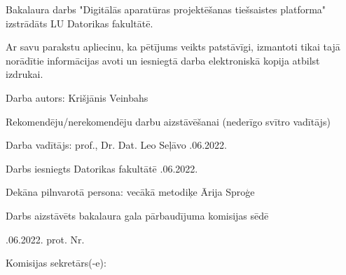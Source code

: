 Bakalaura darbs "Digitālās aparatūras projektēšanas tiešsaistes platforma" izstrādāts LU Datorikas fakultātē.
\vspace{1.5\baselineskip}

Ar savu parakstu apliecinu, ka pētījums veikts patstāvīgi, izmantoti tikai tajā norādītie informācijas avoti un
iesniegtā darba elektroniskā kopija atbilst izdrukai.

Darba autors: \makebox[1.5in]{\hrulefill} Krišjānis Veinbahs
\vspace{1.5\baselineskip}

Rekomendēju/nerekomendēju darbu aizstāvēšanai (nederīgo svītro vadītājs)

Darba vadītājs: prof., Dr. Dat. Leo Seļāvo \makebox[1.5in]{\hrulefill} \makebox[.25in]{\hrulefill}.06.2022.
\vspace{1.5\baselineskip}

Darbs iesniegts Datorikas fakultātē \makebox[1.5in]{\hrulefill} \makebox[.25in]{\hrulefill}.06.2022.
\medskip

Dekāna pilnvarotā persona: vecākā metodiķe Ārija Sproģe \makebox[1.5in]{\hrulefill}
\vspace{1.5\baselineskip}

Darbs aizstāvēts bakalaura gala pārbaudījuma komisijas sēdē

\makebox[.25in]{\hrulefill}.06.2022. prot. Nr. \makebox[.25in]{\hrulefill}
\vspace{1.5\baselineskip}

Komisijas sekretārs(-e):
